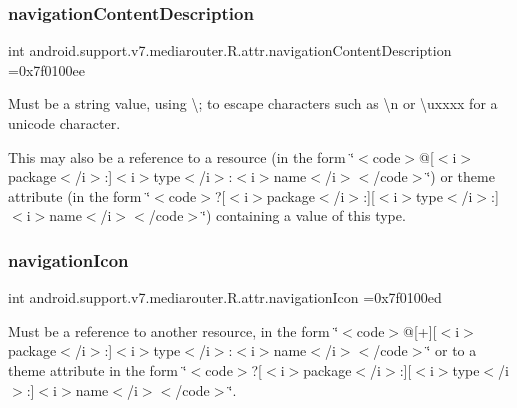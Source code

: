 \subsubsection{\texorpdfstring{navigation\+Content\+Description}{navigationContentDescription}}
{\footnotesize\ttfamily int android.\+support.\+v7.\+mediarouter.\+R.\+attr.\+navigation\+Content\+Description =0x7f0100ee\hspace{0.3cm}{\ttfamily [static]}}

Must be a string value, using \textquotesingle{}\textbackslash{};\textquotesingle{} to escape characters such as \textquotesingle{}\textbackslash{}n\textquotesingle{} or \textquotesingle{}\textbackslash{}uxxxx\textquotesingle{} for a unicode character. 

This may also be a reference to a resource (in the form \char`\"{}$<$code$>$@\mbox{[}$<$i$>$package$<$/i$>$\+:\mbox{]}$<$i$>$type$<$/i$>$\+:$<$i$>$name$<$/i$>$$<$/code$>$\char`\"{}) or theme attribute (in the form \char`\"{}$<$code$>$?\mbox{[}$<$i$>$package$<$/i$>$\+:\mbox{]}\mbox{[}$<$i$>$type$<$/i$>$\+:\mbox{]}$<$i$>$name$<$/i$>$$<$/code$>$\char`\"{}) containing a value of this type. \mbox{\label{classandroid_1_1support_1_1v7_1_1mediarouter_1_1R_1_1attr_a0b5494d37e9e2b02cca76a9260de97ba}} 
\subsubsection{\texorpdfstring{navigation\+Icon}{navigationIcon}}
{\footnotesize\ttfamily int android.\+support.\+v7.\+mediarouter.\+R.\+attr.\+navigation\+Icon =0x7f0100ed\hspace{0.3cm}{\ttfamily [static]}}

Must be a reference to another resource, in the form \char`\"{}$<$code$>$@\mbox{[}+\mbox{]}\mbox{[}$<$i$>$package$<$/i$>$\+:\mbox{]}$<$i$>$type$<$/i$>$\+:$<$i$>$name$<$/i$>$$<$/code$>$\char`\"{} or to a theme attribute in the form \char`\"{}$<$code$>$?\mbox{[}$<$i$>$package$<$/i$>$\+:\mbox{]}\mbox{[}$<$i$>$type$<$/i$>$\+:\mbox{]}$<$i$>$name$<$/i$>$$<$/code$>$\char`\"{}. \mbox{\label{classandroid_1_1support_1_1v7_1_1mediarouter_1_1R_1_1attr_a44f0e044154a4084dcd2d30245a4e7be}} 
